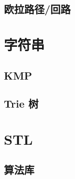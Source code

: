 \documentclass{article}
\begin{document}
\subsection{欧拉路径/回路}



\section{字符串}

\subsection{KMP}



\subsection{Trie 树}



\section{STL}

\subsection{算法库}


\end{document}
